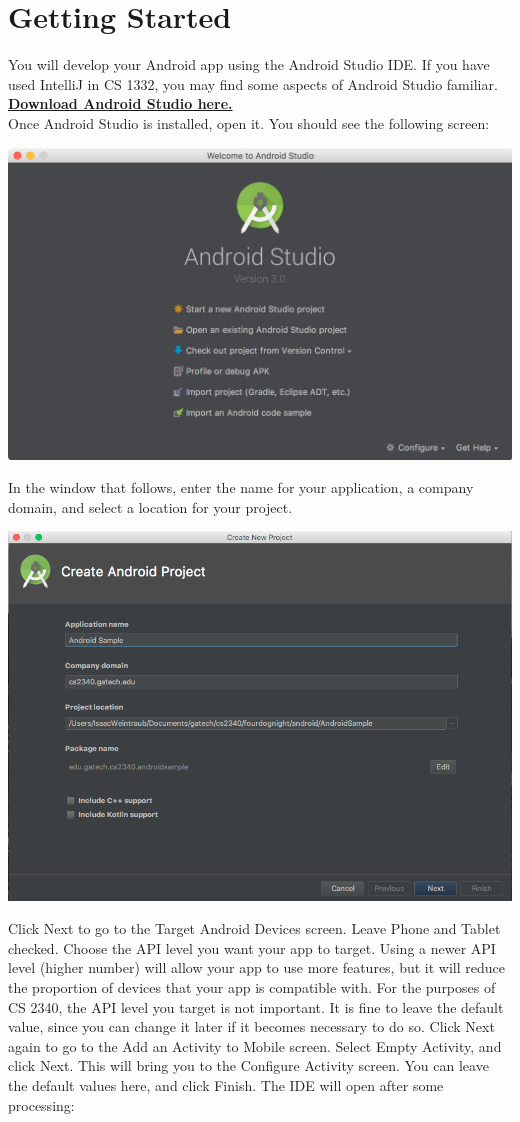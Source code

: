 \documentclass{article}
\begin{document}
\section{Getting Started}
You will develop your Android app using the Android Studio IDE. If you have used IntelliJ in CS 1332, you may find some aspects of Android Studio familiar.\\[0.2cm]
\href{https://developer.android.com/studio/}{\textbf{Download Android Studio here.}}\\[0.2cm]
Once Android Studio is installed, open it. You should see the following screen:
\begin{center}\includegraphics[width=.5\textwidth]{images/studio-open.png}\end{center}
In the window that follows, enter the name for your application, a company domain, and select a location for your project.
\begin{center}\includegraphics[width=.5\textwidth]{images/create-new.png}\end{center}
Click Next to go to the Target Android Devices screen. Leave Phone and Tablet checked. Choose the API level you want your app to target. Using a newer API level (higher number) will allow your app to use more features, but it will reduce the proportion of devices that your app is compatible with. For the purposes of CS 2340, the API level you target is not important. It is fine to leave the default value, since you can change it later if it becomes necessary to do so. Click Next again to go to the Add an Activity to Mobile screen. Select Empty Activity, and click Next. This will bring you to the Configure Activity screen. You can leave the default values here, and click Finish. The IDE will open after some processing:
\end{document}
